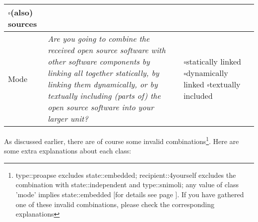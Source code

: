 \begin{small}
\begin{tabular}[h]{|l|l|l|l|}
{    $\square$\hspace{1em}(also) sources}\\
\hline 
  Mode & 
  \parbox[c][2.6cm][c]{9.4cm}{
  \textit{Are you going to combine the received open source software with other
  software components by linking all together statically, by linking them
  dynamically, or by textually including (parts of) the open source software
  into your larger unit?}} &
  \parbox{10em}{
    $\square$\hspace{1em}statically linked\\   
    $\square$\hspace{1em}dynamically linked\\
    $\square$\hspace{1em}textually included}\\
\hline 
\hline
\end{tabular}
\end{small}

As discussed earlier, there are of course some invalid
combinations\footnote{type::proapse excludes state::embedded;
recipient::4yourself excludes the combination with state::independent and
type::snimoli; any value of class 'mode' implies state::embedded [for details
see page \pageref{InvalidFinderTokenCombinations}]. If you have gathered one of
these invalid combinations, please check the corresponding explanations}. Here
are some extra explanations about each class:

